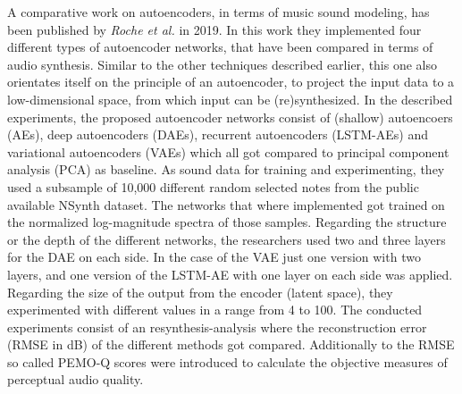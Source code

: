 A comparative work on autoencoders, in terms of music sound modeling, has been published by \textit{Roche et al.} in 2019. \cite{roche2019autoencoders} In this work they implemented four different types of autoencoder networks, that have been compared in terms of audio synthesis. Similar to the other techniques described earlier, this one also orientates itself on the principle of an autoencoder, to project the input data to a low-dimensional space, from which input can be (re)synthesized. In the described experiments, the proposed autoencoder networks consist of (shallow) autoencoers (AEs), deep autoencoders (DAEs), recurrent autoencoders (LSTM-AEs) and variational autoencoders (VAEs) which all got compared to principal component analysis (PCA) as baseline. As sound data for training and experimenting, they used a subsample of 10,000 different random selected notes from the public available NSynth dataset. The networks that where implemented got trained on the normalized log-magnitude spectra of those samples. Regarding the structure or the depth of the different networks, the researchers used two and three layers for the DAE on each side. In the case of the VAE just one version with two layers, and one version of the LSTM-AE with one layer on each side was applied. Regarding the size of the output from the encoder (latent space), they experimented with different values in a range from 4 to 100. The conducted experiments consist of an resynthesis-analysis where the reconstruction error (RMSE in dB) of the different methods got compared. Additionally to the RMSE so called PEMO-Q scores were introduced to calculate the objective measures of perceptual audio quality.\\
